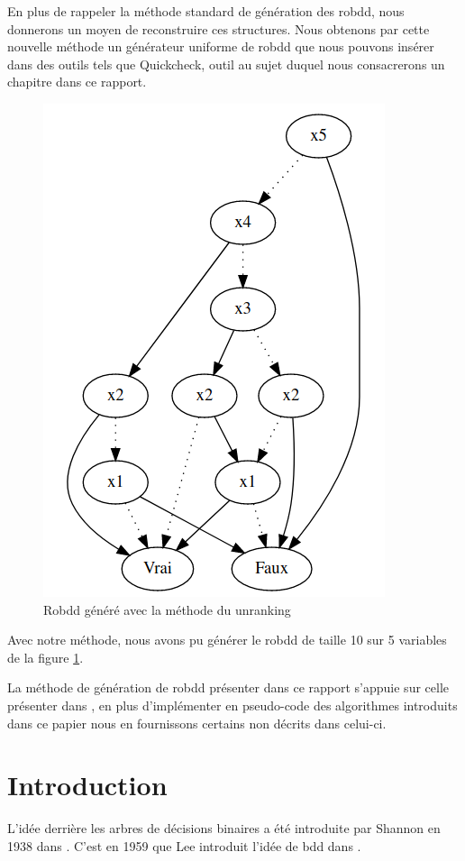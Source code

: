 \documentclass[french]{article}
\begin{document}
En plus de rappeler la méthode standard de génération des robdd, nous donnerons un moyen de reconstruire ces structures. Nous obtenons par cette nouvelle méthode un générateur uniforme de robdd que nous pouvons insérer dans des outils tels que Quickcheck, outil au sujet duquel nous consacrerons un chapitre dans ce rapport. 

\begin{figure}[h!]
    \centering
    \includegraphics[scale=0.4]{robdd de presentation.png}
    \caption{Robdd généré avec la méthode du unranking}
    \label{fig:ROBDD1}
\end{figure}
\newpage
 Avec notre méthode, nous avons pu générer le robdd de taille 10 sur 5 variables de la figure \ref{fig:ROBDD1}.
 
 La méthode de génération de robdd présenter dans ce rapport s'appuie sur celle présenter dans \cite{genitrini}, en plus d'implémenter en pseudo-code des algorithmes introduits dans ce papier nous en fournissons certains non décrits dans celui-ci.



\section{Introduction}
L'idée derrière les arbres de décisions binaires a été introduite par Shannon en 1938 dans \cite{shannon}. C'est en 1959 que Lee introduit l'idée de bdd dans \cite{lee}.
\end{document}

